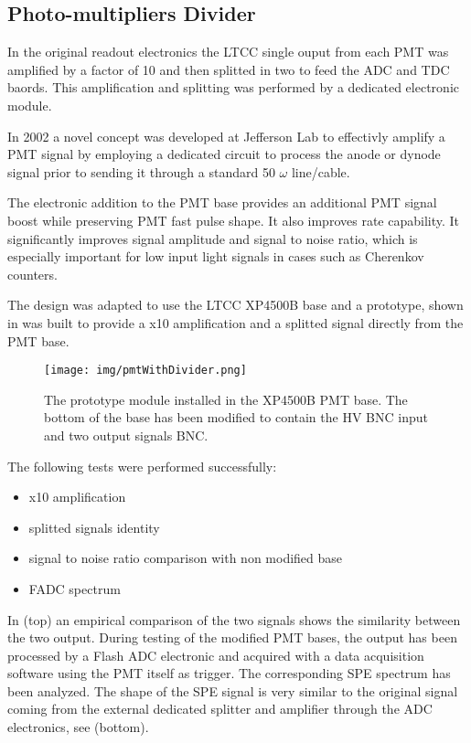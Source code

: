 \subsection{Photo-multipliers Divider}

In the original readout electronics the LTCC single ouput from each PMT was amplified by a factor of 10
and then splitted in two to feed the ADC and TDC baords. This amplification and splitting was performed
by a dedicated electronic module. 

In 2002 a novel concept \cite{Popov:2003mj} was developed at Jefferson Lab to effectivly amplify a PMT signal by employing a dedicated circuit
to process the anode or dynode signal prior to sending it through a standard 50 $\omega$ line/cable.

The electronic addition to the PMT base provides an additional PMT signal boost while preserving
PMT fast pulse shape. It also improves rate capability. It significantly improves signal amplitude and
signal to noise ratio, which is especially important for low input light signals in cases such as Cherenkov counters.

The design was adapted to use the LTCC XP4500B base and a prototype, shown in  was built to provide a x10
amplification and a splitted signal directly from the PMT base.


\begin{figure}
	\centering
	\texttt{[image: img/pmtWithDivider.png]}
	\caption{The prototype module installed in the XP4500B PMT base. The bottom of the base has been modified to contain the HV
				BNC input and two output signals BNC. }
	\label{fig:pmtWithDivider}
\end{figure}

The following tests were performed successfully:
\begin{itemize}
	\item x10 amplification
	\item splitted signals identity
	\item signal to noise ratio comparison with non modified base
	\item FADC spectrum
\end{itemize}

In  (top) an empirical comparison of the two signals shows the similarity between the two output.
During testing of the modified PMT bases, the output has been processed by a Flash ADC electronic and acquired with a data
acquisition software using the PMT itself as trigger.
The corresponding SPE spectrum has been analyzed. The shape of the SPE signal is very similar to the original signal
coming from the external dedicated splitter and amplifier through the ADC electronics, see   (bottom).

